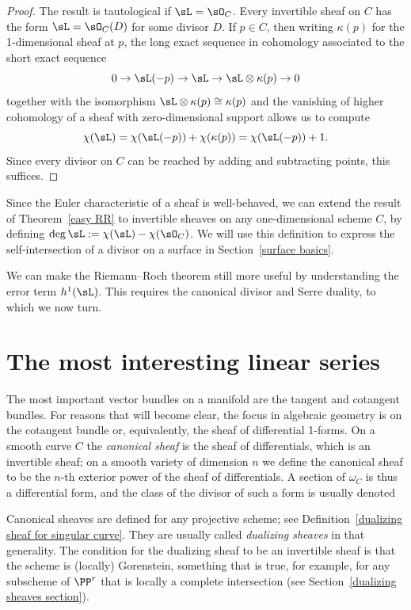 \begin{proof}
 The result is tautological if $\sL = \sO_C$. Every invertible sheaf on $C$ has the form $\sL = \sO_C(D)$ for some
divisor $D$. If $p\in C$, then writing $\kappa(p)$ for the
1-dimensional 
sheaf at $p$, the long exact sequence in cohomology
associated to the short exact sequence
$$
0\to \sL(-p) \to \sL \to \sL\otimes \kappa(p)\to 0
$$
together with the isomorphism $\sL\otimes \kappa(p) \cong \kappa(p)$
and the vanishing of higher cohomology of a sheaf with zero-dimensional support allows us to compute 
$$
\chi(\sL) = \chi(\sL(-p)) + \chi(\kappa(p)) = \chi(\sL(-p)) + 1.
$$
Since every divisor on $C$ can be reached by adding and subtracting points, this suffices.
\end{proof}

Since the Euler characteristic of a sheaf is well-behaved, we can extend the result of Theorem~\ref{easy RR} 
to invertible sheaves on any one-dimensional scheme $C$, by defining
$\deg \sL := \chi(\sL) -\chi(\sO_C)$.
We will use this definition to express the self-intersection of a divisor on a surface in Section~\ref{surface basics}.

We can make the Riemann--Roch theorem still more useful by understanding the error term $h^1(\sL)$. This requires
the canonical divisor and Serre duality, to which
we now turn.


\section{The most interesting linear series}\label{most interesting}

The most important vector bundles on a manifold are the tangent and cotangent bundles. For reasons that
will become clear, the focus in algebraic geometry is on the cotangent
bundle or, equivalently, the sheaf of differential 1-forms. On a
smooth curve $C$ the \emph{canonical sheaf} is the sheaf of
differentials, which is an 
%
invertible sheaf; on a smooth
variety of dimension $n$ we define the canonical sheaf to be the 
$n$-th exterior power of the sheaf of differentials. A section of 
$\omega_C$ is thus a differential form, and the class of the divisor
of such a form is usually denoted 
%

\begin{fact}
Canonical sheaves are defined for any projective scheme; see 
Definition~\ref{dualizing sheaf for singular curve}.
They are usually called 
%
{\it dualizing sheaves} 
in that generality. The condition for the dualizing sheaf to be an invertible
%
sheaf is that the scheme is (locally) Gorenstein, something that is true, for example, for any subscheme of $\PP^r$
that is locally a complete intersection (see Section~\ref{dualizing sheaves section}).
\end{fact}
 

